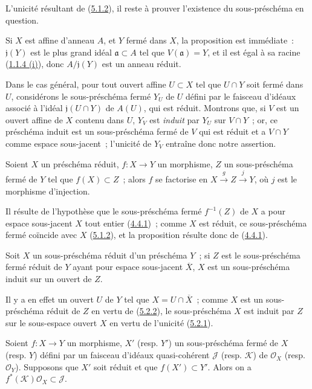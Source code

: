 L'unicité résultant de (\hyperref[I.5.1.2-fr]{5.1.2}), il reste à prouver
l'existence du sous-préschéma en question.

Si $X$ est affine d'anneau $A$, et $Y$ fermé dans $X$, la proposition est
immédiate~: $\mathfrak{j}(Y)$ est le plus grand idéal
$\mathfrak{a}\subset A$ tel que $V(\mathfrak{a})=Y$, et il est égal à sa
racine (\hyperref[I.1.1.4-fr]{1.1.4 (i)}), donc
$A/\mathfrak{j}(Y)$ est un anneau réduit.

Dans le cas général, pour tout ouvert affine $U\subset X$ tel que $U\cap Y$
soit fermé dans $U$, considérons le sous-préschéma fermé $Y_U$ de $U$ défini
par le faisceau d'idéaux associé à l'idéal $\mathfrak{j}(U\cap Y)$ de $A(U)$,
qui est réduit. Montrons que, si $V$ est un ouvert affine de $X$ contenu dans
$U$, $Y_V$ est \emph{induit} par $Y_U$ sur $V\cap Y$~; or, ce préschéma
induit est un sous-préschéma fermé de $V$ qui est réduit et a $V\cap Y$ comme
espace sous-jacent~; l'unicité de $Y_V$ entraîne donc notre assertion.

\begin{proposition}[5.2.2]
\label{I.5.2.2-fr}
Soient $X$ un préschéma réduit, $f:X\to Y$ un morphisme, $Z$ un
sous-préschéma fermé de $Y$ tel que $f(X)\subset Z$~; alors $f$ se factorise
en $X\xrightarrow{g}Z\xrightarrow{j}Y$, où $j$ est le morphisme d'injection.
\end{proposition}

Il résulte de l'hypothèse que le sous-préschéma fermé $f^{-1}(Z)$ de $X$ a
pour espace sous-jacent $X$ tout entier
(\hyperref[I.4.4.1-fr]{4.4.1})~; comme $X$ est réduit, ce sous-préschéma fermé
coïncide avec $X$ (\hyperref[I.5.1.2-fr]{5.1.2}), et la proposition résulte
donc de (\hyperref[I.4.4.1-fr]{4.4.1}).

\begin{corollary}[5.2.3]
\label{I.5.2.3-fr}
Soit $X$ un sous-préschéma réduit d'un préschéma $Y$~; si $Z$ est le
sous-préschéma fermé réduit de $Y$ ayant pour espace sous-jacent
$\overline{X}$, $X$ est un sous-préschéma induit sur un ouvert de $Z$.
\end{corollary}

Il y a en effet un ouvert $U$ de $Y$ tel que
$X=U\cap\overline{X}$~; comme $X$ est un sous-préschéma réduit de $Z$ en
vertu de (\hyperref[I.5.2.2-fr]{5.2.2}), le sous-préschéma $X$ est induit par
$Z$ sur le sous-espace ouvert $X$ en vertu de l'unicité
(\hyperref[I.5.2.1-fr]{5.2.1}).

\begin{corollary}[5.2.4]
\label{I.5.2.4-fr}
Soient $f:X\to Y$ un morphisme, $X'$ (resp. $Y'$) un sous-préschéma fermé de
$X$ (resp. $Y$) défini par un faisceau d'idéaux quasi-cohérent $\mathscr{J}$
(resp. $\mathscr{K}$) de $\mathscr{O}_X$ (resp. $\mathscr{O}_Y$). Supposons
que $X'$ soit réduit et que $f(X')\subset Y'$. Alors on a
$f^*(\mathscr{K})\mathscr{O}_X\subset\mathscr{J}$.
\end{corollary}

